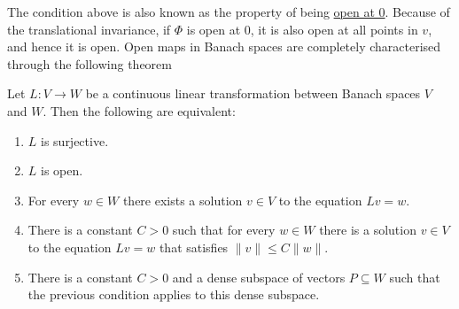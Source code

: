\documentclass[twoside,symmetric, openany, 12pt]{./tuftebook}
\theoremstyle{definition}
\theoremstyle{definition}
\theoremstyle{definition}
\newenvironment{parts}{\begin{enumerate}[label=(\alph*)]}{\end{enumerate}}
\begin{document}
The condition above is also known as the property of being \uline{open at 0}. Because of the translational invariance, if $\Phi$ is open at 0, it is also open at all points in $v$, and hence it is open. Open maps in Banach spaces are completely characterised through the following theorem
\begin{Theorem}
	Let $L:V\to W$ be a continuous linear transformation between Banach spaces $V$ and $W$. Then the following are equivalent:
	\begin{parts}
		\item $L$ is surjective.
		\item $L$ is open.
		\item For every $w\in W$ there exists a solution $v\in V$ to the equation $Lv = w$.
		\item There is a constant $C>0$ such that for every $w\in W$ there is a solution $v\in V$ to the equation $Lv = w$ that satisfies $\|v \| \le C \|w\|$. 
		\item There is a constant $C>0$ and a dense subspace of vectors $P\subseteq W$ such that the previous condition applies to this dense subspace.
	\end{parts}
\end{Theorem}
\end{document}
